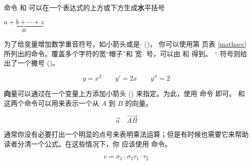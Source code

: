 命令  和  可以在一个表达式的上方或下方生成{\textbf
水平括号}
\begin{example}
$\underbrace{a+b+\cdots+z}_{26}$
\end{example}


为了给变量增加数学重音符号，如小箭头或是 $\tilde{}$ ()，
你可以使用第 \pageref{mathacc} 页表 \ref{mathacc} 所列出的命令。覆盖多个字符的宽“帽子”和
宽 $\tilde{}$ 号，可以由  和  得到。
 \verb|'| 符号则给出了一个撇号 ()。

\begin{example}
\begin{displaymath}
y=x^{2}\qquad y'=2x\qquad y''=2
\end{displaymath}
\end{example}


{\textbf
向量}可以通过在一个变量上方添加小箭头 () 来指定。为此，使用  命令
即可。 和  这两个命令可以用来表示一个从 $A$ 到 $B$ 的向量。

\begin{example}
\begin{displaymath}
\vec a\quad\overrightarrow{AB}
\end{displaymath}
\end{example}


通常你没有必要打出一个明显的点号来表明乘法运算；但是有时候也需要它来帮助读者分清一个公式。在这些情况下，你
应该使用  命令。
\begin{example}
\begin{displaymath}
v = {\sigma}_1 \cdot {\sigma}_2
    {\tau}_1 \cdot {\tau}_2
\end{displaymath}
\end{example}


